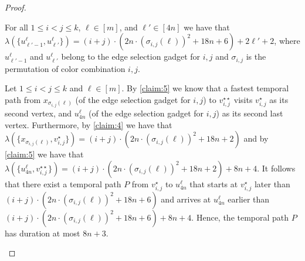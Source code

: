 \documentclass[a4paper,UKenglish,cleveref, autoref, thm-restate]{lipics-v2021}
\begin{document}
\begin{proof}
\begin{claim}\label{claim:6}
    For all $1\le i<j\le k$,  $\ell\in[m]$, and $\ell'\in[4n]$ we have that $\lambda(\{u^\ell_{\ell'-1},u^\ell_{\ell'}\})=(i+j)\cdot (2n\cdot (\sigma_{i,j}(\ell))^2 +18n+6)+2\ell'+2$, where $u^\ell_{\ell'-1}$ and $u^\ell_{\ell'}$ belong to the edge selection gadget for $i,j$ and $\sigma_{i,j}$ is the permutation of color combination $i,j$.
\end{claim}
\begin{claimproof}
    Let $1\le i<j\le k$ and $\ell\in[m]$.
    By \cref{claim:5} we know that a fastest temporal path from $x_{\sigma_{i,j}(\ell)}$ (of the edge selection gadget for $i,j$) to $v_{i,j}^{\star\star}$ visits $v_{i,j}^\star$ as its second vertex, and $u^{\ell}_{4n}$ (of the edge selection gadget for $i,j$) as its second last vertex. 
    Furthermore, by \cref{claim:4} we have that $\lambda(\{x_{\sigma_{i,j}(\ell)},v_{i,j}^{\star}\})=(i+j)\cdot (2n\cdot {(\sigma_{i,j}(\ell))^2}+18n +2)$ and by \cref{claim:5} we have that $\lambda(\{u^\ell_{4n},v_{i,j}^{\star\star}\})=(i+j)\cdot (2n\cdot (\sigma_{i,j}(\ell))^2+18n +2)+8n+4$. It follows that there exist a temporal path $P$ from $v_{i,j}^\star$ to $u^\ell_{4n}$ that starts at $v_{i,j}^\star$ later than $(i+j)\cdot (2n\cdot {(\sigma_{i,j}(\ell))^2} +18n+6)$ and arrives at $u^\ell_{4n}$ earlier than $(i+j)\cdot (2n\cdot (\sigma_{i,j}(\ell))^2 +18n+6)+8n+4$. Hence, the temporal path $P$ has duration at most $8n+3$.


\end{claimproof}
\end{proof}
\end{document}
